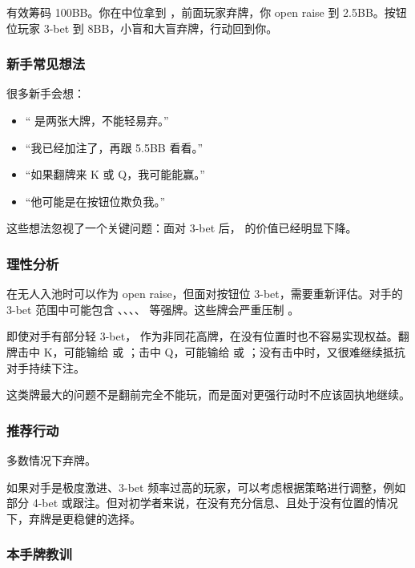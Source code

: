 有效筹码 100BB。你在中位拿到 ，前面玩家弃牌，你 open raise 到 2.5BB。按钮位玩家 3-bet 到 8BB，小盲和大盲弃牌，行动回到你。

\subsubsection*{新手常见想法}

很多新手会想：

\begin{itemize}
\item “ 是两张大牌，不能轻易弃。”
\item “我已经加注了，再跟 5.5BB 看看。”
\item “如果翻牌来 K 或 Q，我可能能赢。”
\item “他可能是在按钮位欺负我。”
\end{itemize}

这些想法忽视了一个关键问题：面对 3-bet 后， 的价值已经明显下降。

\subsubsection*{理性分析}

 在无人入池时可以作为 open raise，但面对按钮位 3-bet，需要重新评估。对手的 3-bet 范围中可能包含 、、、、 等强牌。这些牌会严重压制 。

即使对手有部分轻 3-bet， 作为非同花高牌，在没有位置时也不容易实现权益。翻牌击中 K，可能输给  或 ；击中 Q，可能输给  或 ；没有击中时，又很难继续抵抗对手持续下注。

这类牌最大的问题不是翻前完全不能玩，而是面对更强行动时不应该固执地继续。

\subsubsection*{推荐行动}

多数情况下弃牌。

如果对手是极度激进、3-bet 频率过高的玩家，可以考虑根据策略进行调整，例如部分 4-bet 或跟注。但对初学者来说，在没有充分信息、且处于没有位置的情况下，弃牌是更稳健的选择。

\subsubsection*{本手牌教训}

